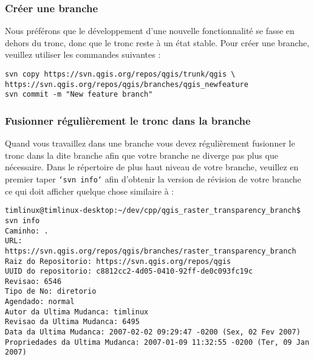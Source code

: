 \subsubsection{Créer une branche}
Nous préférons que le développement d'une nouvelle fonctionnalité se fasse en dehors du tronc, donc que le tronc reste à un état stable. Pour créer une branche, veuillez utiliser les commandes suivantes :
\begin{verbatim}
svn copy https://svn.qgis.org/repos/qgis/trunk/qgis \
https://svn.qgis.org/repos/qgis/branches/qgis_newfeature
svn commit -m "New feature branch"
\end{verbatim}


\subsubsection{Fusionner régulièrement le tronc dans la branche}
Quand vous travaillez dans une branche vous devez régulièrement fusionner le tronc dans la dite branche afin que votre branche ne diverge pas plus que nécessaire. Dans le répertoire de plus haut niveau de votre branche, veuillez en premier taper \texttt{`svn info`} afin d'obtenir la version de révision de votre branche ce qui doit afficher quelque chose similaire à :

\begin{verbatim}
timlinux@timlinux-desktop:~/dev/cpp/qgis_raster_transparency_branch$ svn info
Caminho: .
URL: https://svn.qgis.org/repos/qgis/branches/raster_transparency_branch
Raiz do Repositorio: https://svn.qgis.org/repos/qgis
UUID do repositorio: c8812cc2-4d05-0410-92ff-de0c093fc19c
Revisao: 6546
Tipo de No: diretorio
Agendado: normal
Autor da Ultima Mudanca: timlinux
Revisao da Ultima Mudanca: 6495
Data da Ultima Mudanca: 2007-02-02 09:29:47 -0200 (Sex, 02 Fev 2007)
Propriedades da Ultima Mudanca: 2007-01-09 11:32:55 -0200 (Ter, 09 Jan 2007)
\end{verbatim}

